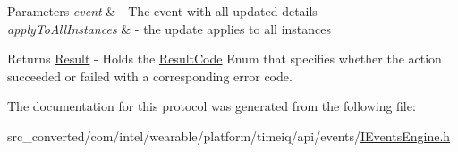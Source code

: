 \begin{DoxyParams}{Parameters}
{\em event} & -\/ The event with all updated details \\
\hline
{\em apply\+To\+All\+Instances} & -\/ the update applies to all instances \\
\hline
\end{DoxyParams}
\begin{DoxyReturn}{Returns}
\hyperlink{interface_result}{Result} -\/ Holds the \hyperlink{interface_result_code}{Result\+Code} Enum that specifies whether the action succeeded or failed with a corresponding error code. 
\end{DoxyReturn}


The documentation for this protocol was generated from the following file\+:\begin{DoxyCompactItemize}
\item 
src\+\_\+converted/com/intel/wearable/platform/timeiq/api/events/\hyperlink{_i_events_engine_8h}{I\+Events\+Engine.\+h}\end{DoxyCompactItemize}
